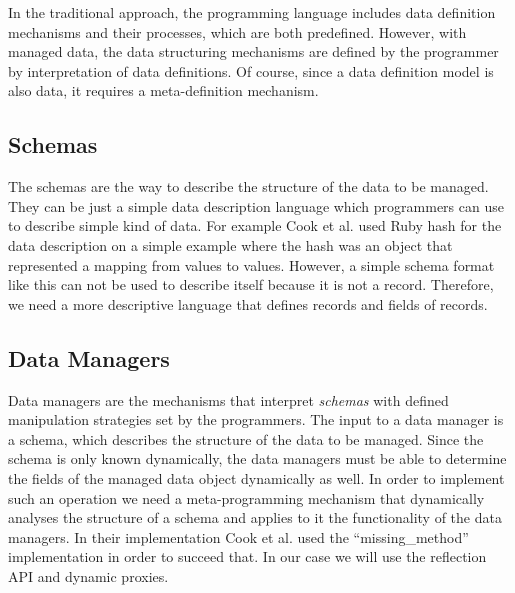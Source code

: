 In the traditional approach, the programming language includes data definition mechanisms and their processes, which are both predefined. 
However, with managed data, the data structuring mechanisms are defined by the programmer by interpretation of data definitions.
Of course, since a data definition model is also data, it requires a meta-definition mechanism.

\subsection{Schemas}\label{Schemas}
The schemas are the way to describe the structure of the data to be managed. 
They can be just a simple data description language which programmers can use to describe simple kind of data. 
For example Cook et al. \cite{loh2012managed} used Ruby hash for the data description on a simple example where the hash was an object that represented a mapping from values to values. 
However, a simple schema format like this can not be used to describe itself because it is not a record. 
Therefore, we need a more descriptive language that defines records and fields of records.


\subsection{Data Managers}\label{Data Managers}
Data managers are the mechanisms that interpret \textit{schemas} with defined manipulation strategies set by the programmers. 
The input to a data manager is a schema, which describes the structure of the data to be managed.
Since the schema is only known dynamically, the data managers must be able to determine the fields of the managed data object dynamically as well.
In order to implement such an operation we need a meta-programming mechanism that dynamically analyses the structure of a schema and applies to it the functionality of the data managers.
In their implementation Cook et al. \cite{loh2012managed} used the ``missing\_method'' implementation in order to succeed that.
In our case we will use the reflection API and dynamic proxies.

